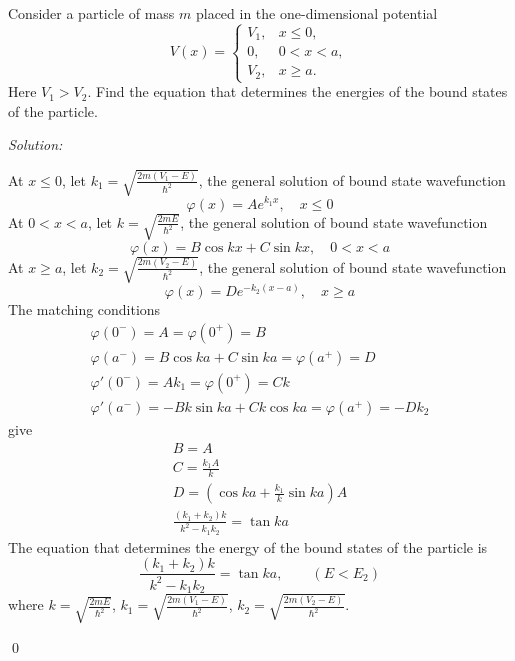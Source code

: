 \documentclass[12pt,a4paper]{article}
\newenvironment{problem}[2][Problem]{\begin{trivlist}
\item[\hskip \labelsep {\bfseries #1}\hskip \labelsep {\bfseries #2.}]}{\end{trivlist}}
\newenvironment{sol}
    {\emph{Solution:}
    }
    {
    \qed
    }
\begin{document}
\begin{problem}{3}
Consider a particle of mass $m$ placed in the one-dimensional potential
\[
V(x)=
\left\{\begin{array}{ll}
V_1,&x\leq0,\\
0,&0<x<a,\\
V_2,&x\geq a.
\end{array}\right.
\]
Here $V_1>V_2$. Find the equation that determines the energies of the bound states of the particle.
\end{problem}
\begin{sol}
At $x\leq0$, let $k_1=\sqrt{\frac{2m(V_1-E)}{\hbar^2}}$, the general solution of bound state wavefunction
\begin{equation}
\varphi(x)=Ae^{k_1x},\quad x\leq0
\end{equation}
At $0<x<a$, let $k=\sqrt{\frac{2mE}{\hbar^2}}$, the general solution of bound state wavefunction
\begin{equation}
\varphi(x)=B\cos kx+C\sin kx,\quad0<x<a
\end{equation}
At $x\geq a$, let $k_2=\sqrt{\frac{2m(V_2-E)}{\hbar^2}}$, the general solution of bound state wavefunction
\begin{equation}
\varphi(x)=De^{-k_2(x-a)},\quad x\geq a
\end{equation}
The matching conditions
\begin{gather}
\varphi(0^-)=A=\varphi(0^+)=B\\
\varphi(a^-)=B\cos ka+C\sin ka=\varphi(a^+)=D\\
\varphi'(0^-)=Ak_1=\varphi(0^+)=Ck\\
\varphi'(a^-)=-Bk\sin ka+Ck\cos ka=\varphi(a^+)=-Dk_2
\end{gather}
give
\begin{gather}
B=A\\
C=\frac{k_1A}{k}\\
D=(\cos ka+\frac{k_1}{k}\sin ka)A\\
\frac{(k_1+k_2)k}{k^2-k_1k_2}=\tan ka
\end{gather}
The equation that determines the energy of the bound states of the particle is
\begin{equation}
\frac{(k_1+k_2)k}{k^2-k_1k_2}=\tan ka,\quad\quad(E<E_2)
\end{equation}
where $k=\sqrt{\frac{2mE}{\hbar^2}}$, $k_1=\sqrt{\frac{2m(V_1-E)}{\hbar^2}}$, $k_2=\sqrt{\frac{2m(V_2-E)}{\hbar^2}}$.
\end{sol}
\end{document}

